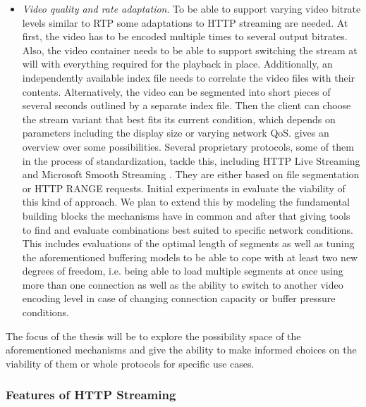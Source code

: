 \begin{itemize}
\item \textit{Video quality and rate adaptation}. To be able to support varying video bitrate levels similar to \gls{RTP} some adaptations to \gls{HTTP} streaming are needed. At first, the video has to be encoded multiple times to several output bitrates. Also, the video container needs to be able to support switching the stream at will with everything required for the playback in place. Additionally, an independently available index file needs to correlate the video files with their contents. Alternatively, the video can be segmented into short pieces of several seconds outlined by a separate index file. Then the client can choose the stream variant that best fits its current condition, which depends on parameters including the display size or varying network \gls{QoS}. \cite{ma2011mobile} gives an overview over some possibilities. Several proprietary protocols, some of them in the process of standardization, tackle this, including \gls{HTTP} Live Streaming \cite{pantos2011livestreaming} and Microsoft Smooth Streaming \cite{zambelli_iis_2009}. They are either based on file segmentation or HTTP RANGE requests. Initial experiments in \cite{akhshabi2011experimental} evaluate the viability of this kind of approach. We plan to extend this by modeling the fundamental building blocks the mechanisms have in common and after that giving tools to find and evaluate combinations best suited to specific network conditions.
This includes evaluations of the optimal length of segments as well as tuning the aforementioned buffering models to be able to cope with at least two new degrees of freedom, i.e. being able to load multiple segments at once using more than one connection as well as the ability to switch to another video encoding level in case of changing connection capacity or buffer pressure conditions.

\end{itemize}

The focus of the thesis will be to explore the possibility space of the aforementioned mechanisms and give the ability to make informed choices on the viability of them or whole protocols for specific use cases.



\subsubsection{Features of HTTP Streaming}

